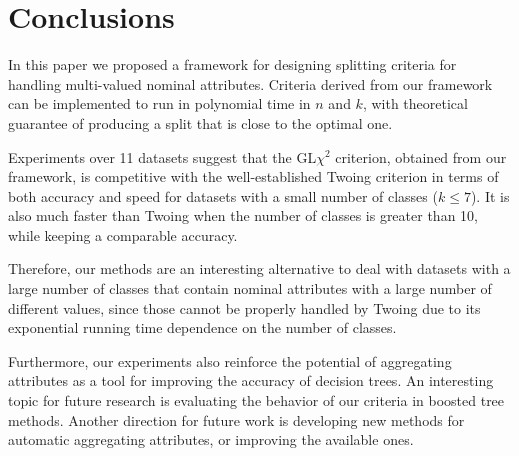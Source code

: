 \newpage

\chapter{Conclusions}
\label{chap:conclusions}



In this paper we proposed a framework for
designing splitting criteria for handling 
multi-valued nominal attributes.
Criteria derived from our framework 
can be implemented to run in polynomial time in
$n$ and $k$, with 
theoretical guarantee of producing a split that is close to the optimal
one.

Experiments over 11 datasets
suggest that the GL$\chi^2$ criterion, obtained from our framework, is competitive with the well-established Twoing criterion in terms of both accuracy and speed for datasets with a small number of classes ($k \leq 7$). It is also much faster than Twoing when the number of classes is greater than 10, while keeping a comparable accuracy.
 
Therefore, our methods are an interesting alternative to deal with
datasets with a large number of classes that contain nominal attributes with a large
number of different values, since those cannot be properly handled by Twoing due to its exponential running time dependence on the number of classes.

Furthermore, our experiments also reinforce
the potential of  aggregating attributes as a tool 
for improving the accuracy of decision trees.
An interesting topic for  future research is evaluating the behavior of our criteria in boosted tree methods.
Another direction for future work is developing new methods for automatic aggregating attributes, or improving the available ones.


